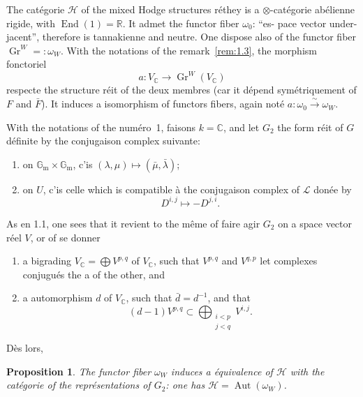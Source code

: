 \documentclass[12pt,a4paper]{article}
\theoremstyle{plain}
\newtheorem{proposition}[lemme]{Proposition}
\theoremstyle{definition}
\DeclareMathOperator{\Gr}{Gr}
\DeclareMathOperator{\Aut}{Aut}
\DeclareMathOperator{\End}{End}
\newcommand{\Gm}{\mathbb{G}_\mathrm{m}}
\newcommand{\C}{\mathbb{C}}
\newcommand{\R}{\mathbb{R}}
\begin{document}
The cat\'{e}gorie $\mathscr{H}$ of the mixed Hodge structures r\'{e}they is a $\otimes$-cat\'{e}gorie
ab\'{e}lienne rigide, with $\End(1) = \R$. It admet the functor fiber $\omega_0$: ``es-
pace vector under-jacent'', therefore is tannakienne and neutre. One dispose also
of the functor fiber $\Gr^W =: \omega_W$. With the notations of the remark~\ref{rem:1.3}, the
morphism fonctoriel
\begin{equation*}
a : V_\C \longrightarrow \Gr^W(V_\C)
\end{equation*}
respecte the structure r\'{e}it of the deux membres (car it d\'{e}pend sym\'{e}triquement
of $F$ and $\bar{F}$). It induces a isomorphism of functors fibers, again not\'{e}
$a : \omega_0 \xrightarrow{\sim} \omega_W$.

With the notations of the num\'{e}ro~1, faisons $k = \C$, and let $G_2$ the form r\'{e}it
of $G$ d\'{e}finite by the conjugaison complex suivante:
\begin{enumerate}[label=\alph*)]
\item on $\Gm \times \Gm$, c'is $(\lambda, \mu) \mapsto (\bar{\mu}, \bar{\lambda})$;
\item on $U$, c'is celle which is compatible \`{a} the conjugaison complex of $\mathcal{L}$
don\'{e}e by
\begin{equation*}
D^{i,j} \mapsto -D^{j,i}.
\end{equation*}
\end{enumerate}

As en 1.1, one sees that it revient to the m\^{e}me of faire agir $G_2$ on a
space vector r\'{e}el $V$, or of se donner
\begin{enumerate}[label=\alph*)]
\item a bigrading $V_\C = \bigoplus V^{p,q}$ of $V_\C$, such that $V^{p,q}$ and $V^{q,p}$ let
complexes conjugu\'{e}s the a of the other, and
\item a automorphism $d$ of $V_\C$, such that $\bar{d} = d^{-1}$, and that
\begin{equation*}
(d-1)V^{p,q} \subset \bigoplus_{\substack{i < p \\ j < q}} V^{i,j}.
\end{equation*}
\end{enumerate}

D\`{e}s lors,

\begin{proposition}\label{prop:2.1}
The functor fiber $\omega_W$ induces a \'{e}quivalence of $\mathscr{H}$ with
the cat\'{e}gorie of the repr\'{e}sentations of $G_2$: one has $\mathscr{H} = \Aut(\omega_W)$.
\end{proposition}
\end{document}
